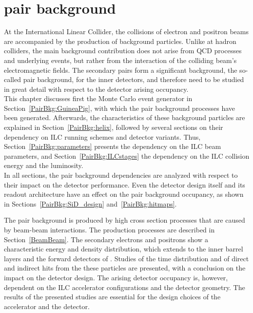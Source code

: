 \chapter{\texorpdfstring{\positron\electron pair background}{Electron-positron pair background}}
\label{PairBkg}

\begin{chapterabstract}
 At the International Linear Collider, the collisions of electron and positron beams are accompanied by the production of background particles.
 Unlike at hadron colliders, the main background contribution does not arise from QCD processes and underlying events, but rather from the interaction of the colliding beam's electromagnetic fields.
 The secondary \positron\electron pairs form a significant background, the so-called pair background, for the inner detectors, and therefore need to be studied in great detail with respect to the detector arising occupancy.
 \\This chapter discusses first the Monte Carlo event generator in Section~\ref{PairBkg:GuineaPig}, with which the pair background processes have been generated.
 Afterwards, the characteristics of these background particles are explained in Section~\ref{PairBkg:helix}, followed by several sections on their dependency on ILC running schemes and \sid detector variants.
 Thus, Section~\ref{PairBkg:parameters} presents the dependency on the ILC beam parameters, and Section~\ref{PairBkg:ILCstages} the dependency on the ILC collision energy and the luminosity.
 \\In all sections, the pair background dependencies are analyzed with respect to their impact on the \sid detector performance.
 Even the detector design itself and its readout architecture have an effect on the pair background occupancy, as shown in Sections~\ref{PairBkg:SiD_design} and~\ref{PairBkg:hitmaps}.
\end{chapterabstract}
\vspace*{0.5cm}\newline
\noindent
The pair background is produced by high cross section processes that are caused by beam-beam interactions.
The production processes are described in Section~\ref{BeamBeam}.
The secondary electrons and positrons show a characteristic energy and density distribution, which extends to the inner barrel layers and the forward detectors of \sid.
Studies of the time distribution and of direct and indirect hits from the these particles are presented, with a conclusion on the impact on the detector design.
The arising detector occupancy is, however, dependent on the ILC accelerator configurations and the detector geometry.
The results of the presented studies are essential for the design choices of the accelerator and the \sid detector.

